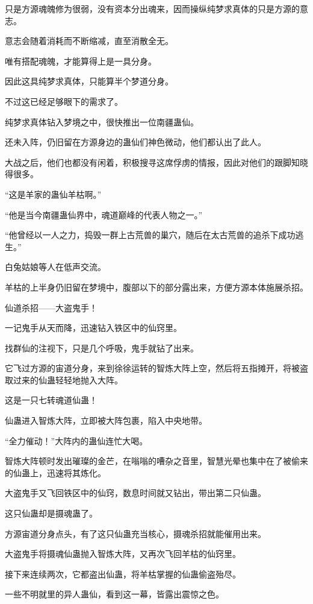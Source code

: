 \begin{this_body}
只是方源魂魄修为很弱，没有资本分出魂来，因而操纵纯梦求真体的只是方源的意志。

意志会随着消耗而不断缩减，直至消散全无。

唯有搭配魂魄，才能算得上是一具分身。

因此这具纯梦求真体，只能算半个梦道分身。

不过这已经足够眼下的需求了。

纯梦求真体钻入梦境之中，很快推出一位南疆蛊仙。

还未入阵，仍旧留在方源身边的蛊仙们神色微动，他们都认出了此人。

大战之后，他们也都没有闲着，积极搜寻这席俘虏的情报，因此对他们的跟脚知晓得很多。

“这是羊家的蛊仙羊枯啊。”

“他是当今南疆蛊仙界中，魂道巅峰的代表人物之一。”

“他曾经以一人之力，捣毁一群上古荒兽的巢穴，随后在太古荒兽的追杀下成功逃生。”

白兔姑娘等人在低声交流。

羊枯的上半身仍旧留在梦境中，腹部以下的部分露出来，方便方源本体施展杀招。

仙道杀招——大盗鬼手！

一记鬼手从天而降，迅速钻入铁区中的仙窍里。

找群仙的注视下，只是几个呼吸，鬼手就钻了出来。

它飞过方源的宙道分身，来到徐徐运转的智炼大阵上空，然后将五指摊开，将被盗取过来的仙蛊轻轻地抛入大阵。

这是一只七转魂道仙蛊！

仙蛊进入智炼大阵，立即被大阵包裹，陷入中央地带。

“全力催动！”大阵内的蛊仙连忙大喝。

智炼大阵顿时发出璀璨的金芒，在嗡嗡的嘈杂之音里，智慧光晕也集中在了被偷来的仙蛊上，迅速将其炼化。

大盗鬼手又飞回铁区中的仙窍，数息时间就又钻出，带出第二只仙蛊。

这只仙蛊却是摄魂蛊了。

方源宙道分身点头，有了这只仙蛊充当核心，摄魂杀招就能催用出来。

大盗鬼手将摄魂仙蛊抛入智炼大阵，又再次飞回羊枯的仙窍里。

接下来连续两次，它都盗出仙蛊，将羊枯掌握的仙蛊偷盗殆尽。

一些不明就里的异人蛊仙，看到这一幕，皆露出震惊之色。


\end{this_body}
